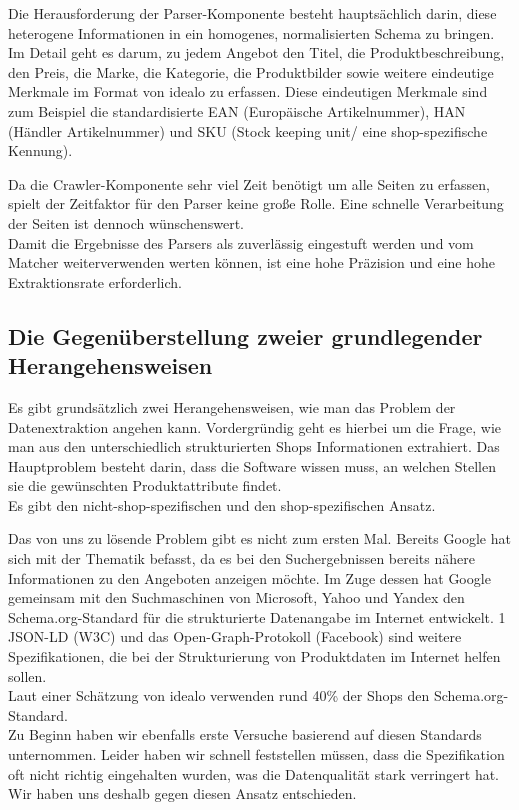Die Herausforderung der Parser-Komponente besteht hauptsächlich darin, diese heterogene Informationen in ein
homogenes, normalisierten Schema zu bringen.
Im Detail geht es darum, zu jedem Angebot den Titel, die Produktbeschreibung, den Preis, die Marke, die Kategorie,
die Produktbilder sowie weitere eindeutige Merkmale im Format von idealo zu erfassen.
Diese eindeutigen Merkmale sind zum Beispiel die standardisierte EAN (Europäische Artikelnummer), HAN (Händler
Artikelnummer) und SKU (Stock keeping unit/ eine shop-spezifische Kennung).

Da die Crawler-Komponente sehr viel Zeit benötigt um alle Seiten zu erfassen, spielt der Zeitfaktor für den Parser
keine große Rolle.
Eine schnelle Verarbeitung der Seiten ist dennoch wünschenswert.\\
Damit die Ergebnisse des Parsers als zuverlässig eingestuft werden und vom Matcher weiterverwenden werten können, ist
eine hohe Präzision und eine hohe Extraktionsrate erforderlich.

\subsection{Die Gegenüberstellung zweier grundlegender Herangehensweisen}
\label{sec:Einleitung-Gegenueberstellung}


Es gibt grundsätzlich zwei Herangehensweisen, wie man das Problem der Datenextraktion angehen kann.
Vordergründig geht es hierbei um die Frage, wie man aus den unterschiedlich strukturierten Shops Informationen
extrahiert.
Das Hauptproblem besteht darin, dass die Software wissen muss, an welchen Stellen sie die gewünschten
Produktattribute findet.\\
Es gibt den nicht-shop-spezifischen und den shop-spezifischen Ansatz.

Das von uns zu lösende Problem gibt es nicht zum ersten Mal.
Bereits Google hat sich mit der Thematik befasst, da es bei den Suchergebnissen bereits nähere Informationen zu den
Angeboten anzeigen möchte.
Im Zuge dessen hat Google gemeinsam mit den Suchmaschinen von Microsoft, Yahoo und Yandex den Schema.org-Standard für
die strukturierte Datenangabe im Internet entwickelt. 1
JSON-LD (W3C) und das Open-Graph-Protokoll (Facebook) sind weitere Spezifikationen, die bei der Strukturierung von
Produktdaten im Internet helfen sollen.\\
Laut einer Schätzung von idealo verwenden rund 40\% der Shops den Schema.org-Standard.\\
Zu Beginn haben wir ebenfalls erste Versuche basierend auf diesen Standards unternommen.
Leider haben wir schnell feststellen müssen, dass die Spezifikation oft nicht richtig eingehalten wurden, was die
Datenqualität stark verringert hat.
Wir haben uns deshalb gegen diesen Ansatz entschieden.

